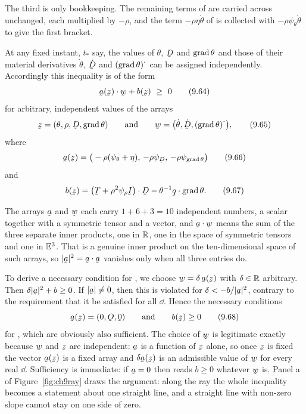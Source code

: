 The third is only bookkeeping. The remaining terms of  are
carried across unchanged, each multiplied by $-\rho$, and the term
$-\rho\eta\dot\theta$ of  is collected with
$-\rho\psi_{\theta}\dot\theta$ to give the first bracket.

At any fixed instant, $t_{*}$ say, the values of $\theta$, $\bD$ and
$\operatorname{grad}\theta$ and those of their material derivatives $\dot\theta$,
$\dot\bD$ and $(\operatorname{grad}\theta)^{\textstyle\cdot}$ can be assigned
independently. Accordingly this inequality is of the form
\begin{equation}
   \ip{\ba(\bz)}\bw+b(\bz)\ \geq\ 0
   \tag{9.64}\label{eq:9.64}
\end{equation}
for arbitrary, independent values of the arrays
\begin{equation}
   \bz=(\theta,\rho,\bD,\grad\theta)
   \qquad\text{and}\qquad
   \bw=\big(\dot\theta,\dot\bD,(\grad\theta)^{\textstyle\cdot}\big),
   \tag{9.65}\label{eq:9.65}
\end{equation}
where
\begin{equation}
   \ba(\bz)=\big(-\rho(\psi_{\theta}+\eta),\,-\rho\psi_{\bD},\,
   -\rho\psi_{\grad\theta}\big)
   \tag{9.66}\label{eq:9.66}
\end{equation}
and
\begin{equation}
   b(\bz)=\ip{\big(\bT+\rho^{2}\psi_{\rho}\I\big)}\bD
   -\theta^{-1}\ip\bq{\grad\theta}.
   \tag{9.67}\label{eq:9.67}
\end{equation}

The arrays $\ba$ and $\bw$ each carry $1+6+3=10$ independent numbers, a
scalar together with a symmetric tensor and a vector, and $\ip\ba\bw$
means the sum of the three separate inner products, one in $\mathbb{R}$, one in
the space of symmetric tensors and one in $\mathbb{E}^{3}$. That is a genuine inner
product on the ten-dimensional space of such arrays, so
$|\ba|^{2}=\ip\ba\ba$ vanishes only when all three entries do.

To derive a necessary condition for , we choose
$\bw=\dd\,\ba(\bz)$ with $\delta\in\mathbb{R}$ arbitrary. Then
$\dd|\ba|^{2}+b\geq0$. If $|\ba|\neq0$, then this is violated for
$\dd<-b/|\ba|^{2}$, contrary to the requirement that it be satisfied for
all $\dd$. Hence the necessary conditions
\begin{equation}
   \ba(\bz)=(0,\Ob,\bze)
   \qquad\text{and}\qquad
   b(\bz)\geq0
   \tag{9.68}\label{eq:9.68}
\end{equation}
for , which are obviously also sufficient. The choice of $\bw$
is legitimate exactly because $\bw$ and $\bz$ are independent: $\ba$ is
a function of $\bz$ alone, so once $\bz$ is fixed the vector $\ba(\bz)$
is a fixed array and $\dd\ba(\bz)$ is an admissible value of $\bw$ for
every real $\dd$. Sufficiency is immediate: if $\ba=0$ then 
reads $b\geq0$ whatever $\bw$ is. Panel a of Figure~\ref{fig:ch9ray}
draws the argument: along the ray the whole inequality becomes a
statement about one straight line, and a straight line with non-zero
slope cannot stay on one side of zero.


